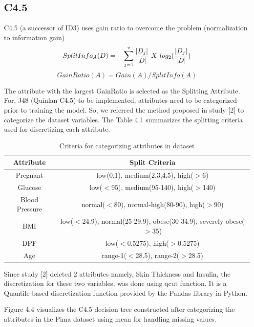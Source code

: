 \subsection{C4.5}
C4.5 (a successor of ID3) uses gain ratio to overcome the problem (normalization to information gain)
\[SplitInfo_A(D) = -\sum_{j=1}^{v} \frac{|D_j|}{|D|}\hspace{0.12cm} X \hspace{0.12cm}log_2(\frac{|D_j|}{|D|}) \]
\[GainRatio(A) = Gain(A)/SplitInfo(A)\]
\par \noindent
The attribute with the largest GainRatio is selected as the Splitting  Attribute.
For, J48 (Quinlan C4.5) to be implemented, attributes need to be categorized prior to training the model. So, we referred the method proposed in study [2] to categorize the dataset variables. The Table 4.1 summarizes the splitting criteria used for discretizing each attribute.
\begin{table}[h]
\begin{center}
\begin{tabular}{| c | c |}
  \hline
  \textbf{Attribute} & \textbf{Split Criteria} \\[0.85ex]
  \hline
  Pregnant & low(0,1), medium(2,3,4,5), high($>$6) \\[0.85ex]
  \hline
  Glucose & low($<$95), medium(95-140), high($>$140) \\[0.85ex]
  \hline
  Blood Pressure & normal($<$80), normal-high(80-90), high($>$90) \\[0.85ex]
  \hline
  BMI & low($<$24.9), normal(25-29.9), obese(30-34.9), severely-obese($>$35) \\[0.85ex]
  \hline
  DPF & low($<$0.5275), high($>$0.5275) \\[0.85ex]
  \hline
  Age & range-1($<$28.5), range-2($>$28.5) \\[0.85ex]
  \hline
\end{tabular}
\end{center}
\caption{\label{table:TT}Criteria for categorizing attributes in dataset}
\end{table}
\par \noindent
Since study [2] deleted 2 attributes namely, Skin Thickness and Insulin, the discretization for these two variables, was done using qcut function.  It is a Quantile-based discretization function provided by the Pandas library in Python.\par \noindent
Figure 4.4 visualizes the C4.5 decision tree constructed after categorizing the attributes in the Pima dataset using mean for handling missing values.
